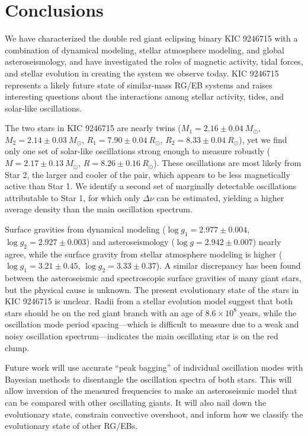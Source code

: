 \section{Conclusions}\label{conclude}

We have characterized the double red giant eclipsing binary KIC 9246715 with a combination of dynamical modeling, stellar atmosphere modeling, and global asteroseismology, and have investigated the roles of magnetic activity, tidal forces, and stellar evolution in creating the system we observe today. KIC 9246715 represents a likely future state of similar-mass RG/EB systems and raises interesting questions about the interactions among stellar activity, tides, and solar-like oscillations.

The two stars in KIC 9246715 are nearly twins ($M_1 = 2.16 \pm 0.04\ M_{\odot}$, $M_2 = 2.14 \pm 0.03\ M_{\odot}$, $R_1 = 7.90 \pm 0.04 \ R_{\odot}$, $R_2 = 8.33 \pm 0.04 \ R_{\odot}$), yet we find only one set of solar-like oscillations strong enough to measure robustly ($M = 2.17 \pm 0.13 \ M_{\odot}$, $R = 8.26 \pm 0.16 \ R_{\odot}$). These oscillations are most likely from Star 2, the larger and cooler of the pair, which appears to be less magnetically active than Star 1. We identify a second set of marginally detectable oscillations attributable to Star 1, for which only $\Delta \nu$ can be estimated, yielding a higher average density than the main oscillation spectrum.

Surface gravities from dynamical modeling ($\log g_1 = 2.977 \pm 0.004$, $\log g_2 = 2.927 \pm 0.003$) and asteroseismology ($\log g = 2.942 \pm 0.007$) nearly agree, while the surface gravity from stellar atmosphere modeling is higher ($\log g_1 = 3.21 \pm 0.45$, $\log g_2 = 3.33 \pm 0.37$). A similar discrepancy has been found between the asteroseismic and spectroscopic surface gravities of many giant stars, but the physical cause is unknown. The present evolutionary state of the stars in KIC 9246715 is unclear. Radii from a stellar evolution model suggest that both stars should be on the red giant branch with an age of $8.6 \times 10^8$ years, while the oscillation mode period spacing---which is difficult to measure due to a weak and noisy oscillation spectrum---indicates the main oscillating star is on the red clump.

Future work will use accurate ``peak bagging'' of individual oscillation modes with Bayesian methods to disentangle the oscillation spectra of both stars. This will allow inversion of the measured frequencies to make an asteroseismic model that can be compared with other oscillating giants. It will also nail down the evolutionary state, constrain convective overshoot, and inform how we classify the evolutionary state of other RG/EBs.

